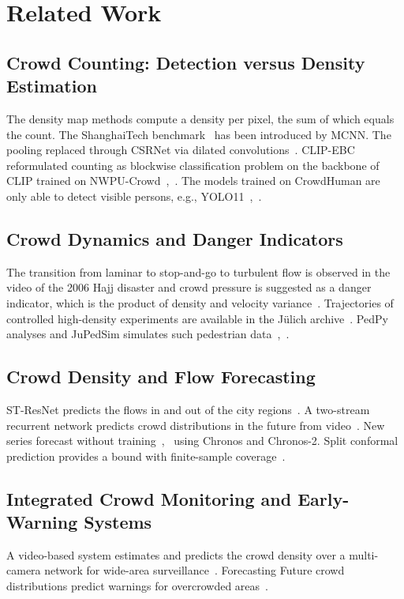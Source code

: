 \documentclass[conference]{IEEEtran}
\begin{document}
\section{Related Work}
\subsection{Crowd Counting: Detection versus Density Estimation}
The density map methods compute a density per pixel, the sum of which equals the count. The ShanghaiTech benchmark~\cite{zhang2016mcnn} has been introduced by MCNN. The pooling replaced through CSRNet via dilated convolutions~\cite{li2018csrnet}. CLIP-EBC reformulated counting as blockwise classification problem on the backbone of CLIP trained on NWPU-Crowd~\cite{ma2025clipebc},~\cite{wang2021nwpu}. The models trained on CrowdHuman are only able to detect visible persons, e.g., YOLO11~\cite{yolo11},~\cite{shao2018crowdhuman}.

\subsection{Crowd Dynamics and Danger Indicators}
The transition from laminar to stop-and-go to turbulent flow is observed in the video of the 2006 Hajj disaster and crowd pressure is suggested as a danger indicator, which is the product of density and velocity variance~\cite{helbing2007}. Trajectories of controlled high-density experiments are available in the J\"ulich archive~\cite{julich_archive}. PedPy analyses and JuPedSim simulates such pedestrian data~\cite{pedpy},~\cite{jupedsim}.

\subsection{Crowd Density and Flow Forecasting}
ST-ResNet predicts the flows in and out of the city regions~\cite{zhang2017stresnet}. A two-stream recurrent network predicts crowd distributions in the future from video~\cite{niu2020overcrowdedness}. New series forecast without training~\cite{ansari2024chronos},~\cite{ansari2025chronos2} using Chronos and Chronos-2. Split conformal prediction provides a bound with finite-sample coverage~\cite{angelopoulos2023conformal}.

\subsection{Integrated Crowd Monitoring and Early-Warning Systems}
A video-based system estimates and predicts the crowd density over a multi-camera network for wide-area surveillance~\cite{cao2013video}. Forecasting Future crowd distributions predict warnings for overcrowded areas~\cite{niu2020overcrowdedness}.
\end{document}
